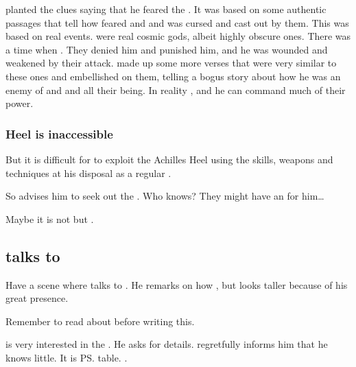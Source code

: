 \Ishnaruchaefir planted the clues saying that he feared the \malgryph.
It was based on some authentic \WanderersInDarknessEmph passages that tell how \Ishnaruchaefir feared \Zaz and \Urzaz and was cursed and cast out by them.
This was based on real events.
 were real cosmic gods, albeit highly obscure ones. 
There was a time when . 
They denied him and punished him, and he was wounded and weakened by their attack.
\Ishnaruchaefir made up some more \WanderersInDarknessEmph verses that were very similar to these ones and embellished on them, telling a bogus story about how he was an enemy of \Zaz and \Urzaz and all their being. 
In reality , and he can command much of their power.





\subsubsection{Heel is inaccessible}
But it is difficult for \Teshrial{} to exploit the Achilles Heel using the skills, weapons and techniques at his disposal as a regular \resphan. 

So \Menessiaraid{} advises him to seek out the . 
Who knows? 
They might have an  for him\ldots{}

Maybe it is not \Menessiaraid{} but \Azraid{} . 








\subsection{\Teshrial talks to \Azraid}
Have a scene where \Teshrial{} talks to . 
He remarks on how , but looks taller because of his great presence. 

Remember to read about  before writing this. 

\Azraid{} is very interested in the \vertexspike{}. 
He asks \Teshrial{} for details. 
\Teshrial{} regretfully informs him that he knows little. 
It is \ps{\Achsah} table. 
\Azraid{} . 

